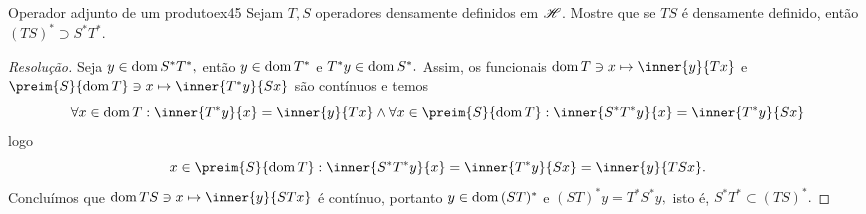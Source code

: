 \begin{exercício}{Operador adjunto de um produto}{ex45}
  Sejam \(T, S\) operadores densamente definidos em \(\mathscr{H}\). Mostre que se \(TS\) é densamente definido, então \((TS)^* \supset S^*T^*.\)
\end{exercício}
\begin{proof}[Resolução]
  Seja \(y \in \operatorname{dom}{S^*T^*},\) então \(y \in \operatorname{dom}{T^*}\) e \(T^*y \in \operatorname{dom}{S^*}.\) Assim, os funcionais \(\dom{T} \ni x \mapsto \inner{y}{Tx}\) e \(\preim{S}{\dom{T}}\ni x \mapsto \inner{T^*y}{Sx}\) são contínuos e temos
  \begin{equation*}
    \forall x \in \dom{T} : \inner{T^*y}{x} = \inner{y}{Tx} \land \forall x \in \preim{S}{\dom{T}} : \inner{S^*T^*y}{x} = \inner{T^*y}{Sx}
  \end{equation*}
  logo
  \begin{equation*}
    x \in \preim{S}{\dom{T}} : \inner{S^*T^*y}{x} = \inner{T^*y}{Sx} = \inner{y}{TSx}.
  \end{equation*}
  Concluímos que \(\dom{TS} \ni x \mapsto \inner{y}{STx}\) é contínuo, portanto \(y \in \operatorname{dom}{(ST)^*}\) e \((ST)^*y = T^*S^*y,\) isto é, \(S^*T^* \subset (TS)^*.\)
\end{proof}
